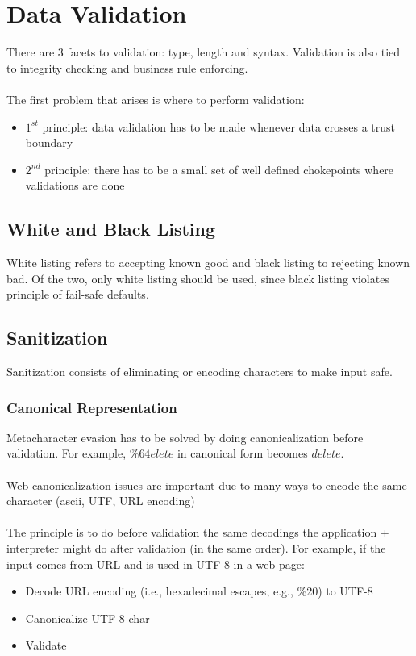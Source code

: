 \documentclass[10pt,a4paper]{report}
\begin{document}
\section{Data Validation}
There are 3 facets to validation: type, length and syntax. Validation is also tied to integrity checking and business rule enforcing.\\
\\
The first problem that arises is where to perform validation:
\begin{itemize}
\item $1^{st}$ principle: data validation has to be made whenever data crosses a trust boundary
\item $2^{nd}$ principle: there has to be a small set of well defined chokepoints where validations are done
\end{itemize}
\subsection{White and Black Listing}
White listing refers to accepting known good and black listing to rejecting known bad. Of the two, only white listing should be used, since black listing  violates principle of fail-safe defaults.
\subsection{Sanitization}
Sanitization consists of eliminating or encoding characters to make input safe.
\subsubsection{Canonical Representation}
Metacharacter evasion has to be solved by doing canonicalization before validation. For example, $\%64elete$ in canonical form becomes $delete$.\\
\\
Web canonicalization issues are important due to many ways to encode the same character (ascii, UTF, URL encoding)\\
\\
The principle is to do before validation the same decodings the application + interpreter might do after validation (in the same order). For example, if the input comes from URL and is used in UTF-8 in a web page:
\begin{itemize}
\item Decode URL encoding (i.e., hexadecimal escapes, e.g., \%20) to UTF-8
\item Canonicalize UTF-8 char
\item Validate
\end{itemize}
\end{document}
